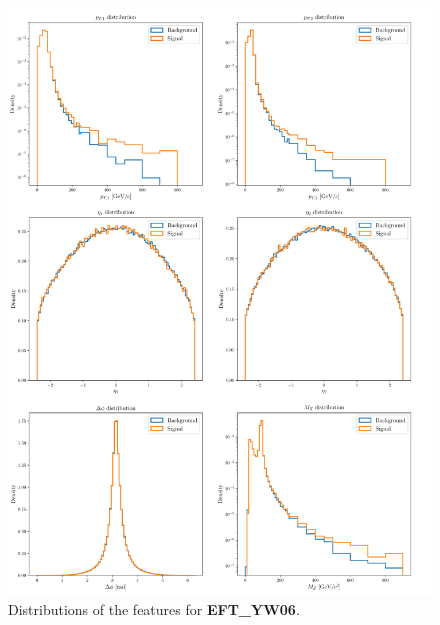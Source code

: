 \begin{figure}
	\centering
	\includegraphics[width=1.0\textwidth]{Python/Z/features_EFT_YW06.pdf}
	\caption{Distributions of the features for \textbf{EFT\_YW06}.}
	\label{fig:EFT_YW06_FEATURES_DISTRIBUTIONS}
\end{figure}